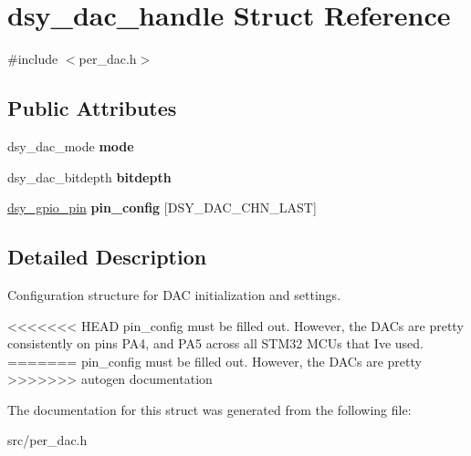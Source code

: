 \hypertarget{structdsy__dac__handle}{}\section{dsy\+\_\+dac\+\_\+handle Struct Reference}
\label{structdsy__dac__handle}


{\ttfamily \#include $<$per\+\_\+dac.\+h$>$}

\subsection*{Public Attributes}
\begin{DoxyCompactItemize}
\item 
\mbox{\label{structdsy__dac__handle_aa8573096053ad1eb282de7ff841b2113}} 
dsy\+\_\+dac\+\_\+mode {\bfseries mode}
\item 
\mbox{\label{structdsy__dac__handle_abef82b9e9f042d39151a3b0854b005ba}} 
dsy\+\_\+dac\+\_\+bitdepth {\bfseries bitdepth}
\item 
\mbox{\label{structdsy__dac__handle_a3e2818d6be8c6b993bccba8401edf8b3}} 
\hyperlink{structdsy__gpio__pin}{dsy\+\_\+gpio\+\_\+pin} {\bfseries pin\+\_\+config} \mbox{[}D\+S\+Y\+\_\+\+D\+A\+C\+\_\+\+C\+H\+N\+\_\+\+L\+A\+ST\mbox{]}
\end{DoxyCompactItemize}


\subsection{Detailed Description}
Configuration structure for D\+AC initialization and settings.

<<<<<<< HEAD
pin\+\_\+config must be filled out. However, the D\+A\+Cs are pretty consistently on pins P\+A4, and P\+A5 across all S\+T\+M32 M\+C\+Us that I\textquotesingle{}ve used. 
=======
pin\+\_\+config must be filled out. However, the D\+A\+Cs are pretty 
>>>>>>> autogen documentation

The documentation for this struct was generated from the following file\+:\begin{DoxyCompactItemize}
\item 
src/per\+\_\+dac.\+h\end{DoxyCompactItemize}
